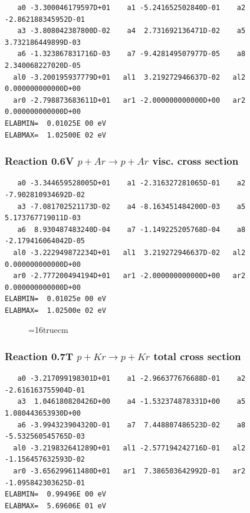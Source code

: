 \documentclass[12pt,dvips]{article}
\begin{document}
\begin{small}\begin{verbatim}
   a0 -3.300046179597D+01    a1 -5.241652502840D-01    a2 -2.862188345952D-01
   a3 -3.808042387800D-02    a4  2.731692136471D-02    a5  3.732186449899D-03
   a6 -1.323867831716D-03    a7 -9.428149507977D-05    a8  2.340068227020D-05
  al0 -3.200195937779D+01   al1  3.219272946637D-02   al2  0.000000000000D+00
  ar0 -2.798873683611D+01   ar1 -2.000000000000D+00   ar2  0.000000000000D+00
ELABMIN=  0.01025E 00 eV
ELABMAX=  1.02500E 02 eV
\end{verbatim}\end{small}

\subsubsection{
Reaction 0.6V   $ p + Ar \rightarrow p + Ar  $ visc. cross
section }


\begin{small}\begin{verbatim}
   a0 -3.344659528005D+01    a1 -2.316327281065D-01    a2 -7.902810934692D-02
   a3 -7.081702521173D-02    a4 -8.163451484200D-03    a5  5.173767719011D-03
   a6  8.930487483240D-04    a7 -1.149225205768D-04    a8 -2.179416064042D-05
  al0 -3.222949872234D+01   al1  3.219272946637D-02   al2  0.000000000000D+00
  ar0 -2.777200494194D+01   ar1 -2.000000000000D+00   ar2  0.000000000000D+00
ELABMIN=  0.01025e 00 eV
ELABMAX=  1.02500e 02 eV
\end{verbatim}\end{small}



\begin{figure} \label{0.6}
\epsfxsize=16truecm
\end{figure}
\newpage



\subsubsection{
Reaction 0.7T   $ p + Kr \rightarrow p + Kr $ total cross
section }



\begin{small}\begin{verbatim}
   a0 -3.217099198301D+01    a1 -2.966377676688D-01    a2 -2.616163755904D-01
   a3  1.046180820426D+00    a4 -1.532374878331D+00    a5  1.080443653930D+00
   a6 -3.994323904320D-01    a7  7.448807486523D-02    a8 -5.532560545765D-03
  al0 -3.219832641289D+01   al1 -2.577194242716D-01   al2 -1.156457632593D-02
  ar0 -3.656299611480D+01   ar1  7.386503642992D-01   ar2 -1.095842303625D-01
ELABMIN=  0.99496E 00 eV
ELABMAX=  5.69606E 01 eV
\end{verbatim}\end{small}
\end{document}

